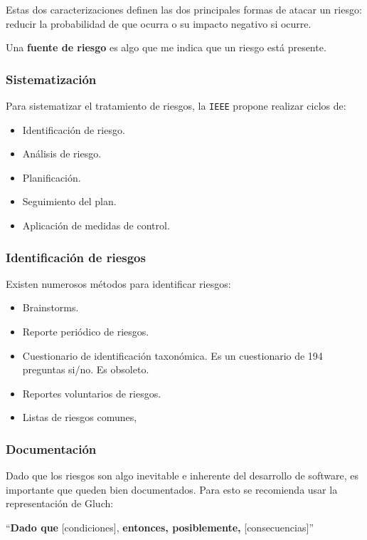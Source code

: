 \documentclass[]{article}
\begin{document}
Estas dos caracterizaciones definen las dos principales formas de atacar un riesgo: reducir la probabilidad de que ocurra o su impacto negativo si ocurre.

Una \textbf{fuente de riesgo} es algo que me indica que un riesgo está presente.

\subsubsection{Sistematización}
Para sistematizar el tratamiento de riesgos, la \texttt{IEEE} propone realizar ciclos de:
\begin{itemize}
	\item Identificación de riesgo.
	\item Análisis de riesgo.
	\item Planificación.
	\item Seguimiento del plan.
	\item Aplicación de medidas de control.
\end{itemize}



\subsubsection{Identificación de riesgos}
Existen numerosos métodos para identificar riesgos:

\begin{itemize}
	\item Brainstorms.
	\item Reporte periódico de riesgos.
	\item Cuestionario de identificación taxonómica. Es un cuestionario de 194 preguntas si/no. Es obsoleto.
	\item Reportes voluntarios de riesgos.
	\item Listas de riesgos comunes,
\end{itemize}


\subsubsection{Documentación}
Dado que los riesgos son algo inevitable e inherente del desarrollo de software, es importante que queden bien documentados. Para esto se recomienda usar la representación de Gluch:

\begin{center}
	``\textbf{Dado que} [condiciones], \textbf{entonces, posiblemente, } [consecuencias]''
\end{center}
\end{document}
